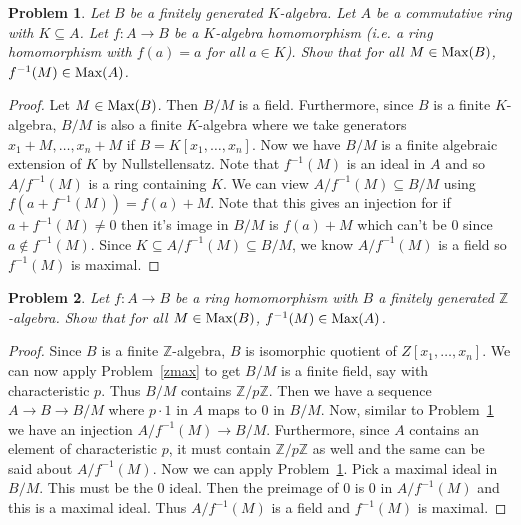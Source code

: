 \documentclass{article}
\newcommand{\Max}{\textup{Max}}
\newtheorem{problem}{Problem}
\begin{document}
\begin{problem}
\label{homomax}
Let $B$ be a finitely generated $K$-algebra. Let $A$ be a commutative ring with $K \subseteq A$. Let $f: A \to B$ be a $K$-algebra homomorphism (i.e. a ring homomorphism with $f(a) = a$ for all $a \in K$). Show that for all $M \in \Max(B)$, $f^{-1}(M) \in \Max(A)$.
\end{problem}
\begin{proof}
Let $M \in \Max(B)$. Then $B/M$ is a field. Furthermore, since $B$ is a finite $K$-algebra, $B/M$ is also a finite $K$-algebra where we take generators $x_1 + M, \dots , x_n + M$ if $B = K[x_1, \dots , x_n]$. Now we have $B/M$ is a finite algebraic extension of $K$ by Nullstellensatz. Note that $f^{-1}(M)$ is an ideal in $A$ and so $A/f^{-1}(M)$ is a ring containing $K$. We can view $A/f^{-1}(M) \subseteq B/M$ using $f(a + f^{-1}(M)) = f(a) + M$. Note that this gives an injection for if $a + f^{-1}(M) \neq 0$ then it's image in $B/M$ is $f(a) + M$ which can't be $0$ since $a \notin f^{-1}(M)$. Since $K \subseteq A/f^{-1}(M) \subseteq B/M$, we know $A/f^{-1}(M)$ is a field so $f^{-1}(M)$ is maximal.
\end{proof}

\begin{problem}
Let $f : A \to B$ be a ring homomorphism with $B$ a finitely generated $\mathbb{Z}$-algebra. Show that for all $M \in \Max(B)$, $f^{-1}(M) \in \Max(A)$.
\end{problem}
\begin{proof}
Since $B$ is a finite $\mathbb{Z}$-algebra, $B$ is isomorphic quotient of $Z[x_1, \dots , x_n]$. We can now apply Problem~\ref{zmax} to get $B/M$ is a finite field, say with characteristic $p$. Thus $B/M$ contains $\mathbb{Z}/p\mathbb{Z}$. Then we have a sequence $A \to B \to B/M$ where $p \cdot 1$ in $A$ maps to $0$ in $B/M$. Now, similar to Problem~\ref{homomax} we have an injection $A/f^{-1}(M) \to B/M$. Furthermore, since $A$ contains an element of characteristic $p$, it must contain $\mathbb{Z}/p\mathbb{Z}$ as well and the same can be said about $A/f^{-1}(M)$. Now we can apply Problem~\ref{homomax}. Pick a maximal ideal in $B/M$. This must be the $0$ ideal. Then the preimage of $0$ is $0$ in $A/f^{-1}(M)$ and this is a maximal ideal. Thus $A/f^{-1}(M)$ is a field and $f^{-1}(M)$ is maximal.
\end{proof}
\end{document}
